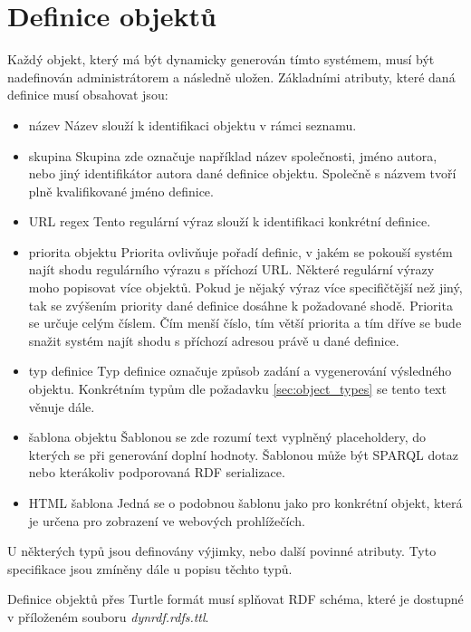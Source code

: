 \documentclass[thesis=B,czech]{FITthesis}[2012/06/26]
\begin{document}
 \section{Definice objektů}\label{obj_def}
  Každý objekt, který má být dynamicky generován tímto systémem, musí být nadefinován administrátorem a následně uložen.
  Základními atributy, které daná definice musí obsahovat jsou:
  \begin{itemize}
    \item název
      \subitem Název slouží k identifikaci objektu v rámci seznamu.
    \item skupina
      \subitem Skupina zde označuje například název společnosti, jméno autora, nebo jiný identifikátor autora dané definice objektu. 
      Společně s názvem tvoří plně kvalifikované jméno definice.
    \item URL regex
      \subitem Tento regulární výraz slouží k identifikaci konkrétní definice.
    \item priorita objektu
      \subitem Priorita ovlivňuje pořadí definic, v jakém se pokouší systém najít shodu regulárního výrazu s příchozí URL. Některé regulární
      výrazy moho popisovat více objektů. Pokud je nějaký výraz více specifičtější než jiný, tak se zvýšením priority dané definice dosáhne k požadované shodě.
      Priorita se určuje celým číslem. Čím menší číslo, tím větší priorita a tím dříve se bude snažit systém najít shodu s příchozí adresou právě u dané definice.
      
    \item typ definice
      \subitem Typ definice označuje způsob zadání a vygenerování výsledného objektu. Konkrétním typům dle požadavku \ref{sec:object_types} se tento text věnuje dále.
    \item šablona objektu
      \subitem Šablonou se zde rozumí text vyplněný placeholdery, do kterých se při generování doplní hodnoty. Šablonou může být SPARQL dotaz nebo kterákoliv 
      podporovaná RDF serializace.
      
    \item HTML šablona
      \subitem Jedná se o podobnou šablonu jako pro konkrétní objekt, která je určena pro zobrazení ve webových prohlížečích.    
 \end{itemize}
 U některých typů jsou definovány výjimky, nebo další povinné atributy. Tyto specifikace jsou zmíněny dále u popisu těchto typů.
 
 Definice objektů přes Turtle formát musí splňovat RDF schéma, které je dostupné v příloženém souboru \textit{dynrdf.rdfs.ttl}.
 
\end{document}

